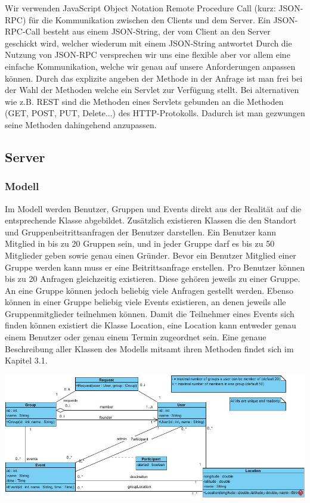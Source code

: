 	Wir verwenden JavaScript Object Notation Remote Procedure Call (kurz: JSON-RPC) für die Kommunikation zwischen den Clients und dem Server.
	Ein JSON-RPC-Call besteht aus einem JSON-String, der vom Client an den Server geschickt wird, welcher wiederum mit einem JSON-String antwortet
	Durch die Nutzung von JSON-RPC versprechen wir uns eine flexible aber vor allem eine einfache Kommunikation, welche wir genau auf unsere Anforderungen anpassen können.
Durch das explizite angeben der Methode in der Anfrage ist man frei bei der Wahl der Methoden welche ein Servlet zur Verfügung stellt. Bei alternativen wie z.B. REST sind die Methoden eines Servlets gebunden an die Methoden (GET, POST, PUT, Delete...) des HTTP-Protokolls. Dadurch ist man gezwungen seine Methoden dahingehend anzupassen.

	
	\subsection{Server}
	\subsubsection{Modell}
Im Modell werden Benutzer, Gruppen und Events direkt aus der Realität auf die entsprechende Klasse abgebildet. Zusätzlich existieren Klassen die den Standort und Gruppenbeitrittsanfragen der Benutzer darstellen.
Ein Benutzer kann Mitglied in bis zu 20 Gruppen sein, und in jeder Gruppe darf es bis zu 50 Mitglieder geben sowie genau einen Gründer. Bevor ein Benutzer Mitglied einer Gruppe werden kann muss er eine Beitrittsanfrage erstellen.
Pro Benutzer können bis zu 20 Anfragen gleichzeitig existieren. Diese gehören jeweils zu einer Gruppe.
An eine Gruppe können jedoch beliebig viele Anfragen gestellt werden.
Ebenso können in einer Gruppe beliebig viele Events existieren, an denen jeweils alle Gruppenmitglieder teilnehmen können.
Damit die Teilnehmer eines Events sich finden können existiert die Klasse Location, eine Location kann entweder genau einem Benutzer oder genau einem Termin zugeordnet sein. 
Eine genaue Beschreibung aller Klassen des Modells mitsamt ihren Methoden findet sich im Kapitel 3.1.

\includegraphics[width=1.1\textwidth]{ModelClassDiagram.jpg}

